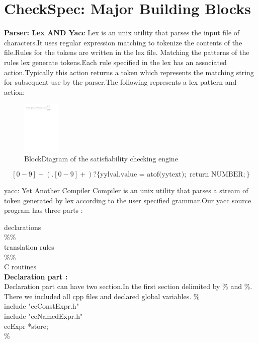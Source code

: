 \documentclass{svmult}
\begin{document}
\section{CheckSpec: Major Building Blocks} \label{sec4}


\noindent
{\bf Parser: Lex AND Yacc} 
Lex is an unix utility that parses the input file of characters.It uses 
regular expression matching to tokenize the contents of the file.Rules 
for the tokens are written in the lex file. Matching the patterns of the 
rules lex generate tokens.Each rule specified in the lex has an associated
action.Typically this action returns a token which represents the matching string 
for subsequent use by the parser.The following represents a lex pattern and action:

\begin{figure}[!h]
\includegraphics[height=2.5cm, width=\linewidth]{BlockDiagram_horizontal.pdf}
\caption{BlockDiagram of the satisfiability checking engine} \label{fig1}
\end{figure}

\noindent
\[
[0 - 9]+(.[0 - 9]+)? \{ 
    \text{yylval.value = atof(yytext)};
    \text{  return NUMBER};
\}
\]

\noindent
yacc: Yet Another Compiler Compiler is an unix utility that parses a stream
of token generated by lex according to the user specified grammar.Our yacc source 
program has three parts :
  
  \noindent
  declarations\\  
  \%\%\\    
  translation rules\\  
  \%\%\\  
  C routines\\
  
  \noindent
{\bf Declaration part :}\\
  Declaration part can have two section.In the first section delimited by 
  \%{ and \%}. There we included all cpp files and declared global variables.
  \%{\\
  include "eeConstExpr.h"\\
  include "eeNamedExpr.h"\\  
  eeExpr *store;\\
  \%}
    
\end{document}
